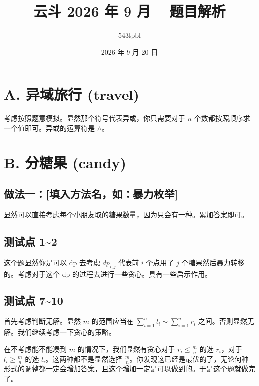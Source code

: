 \documentclass[12pt]{ctexart}  %
\title{云斗 2026 年 9 月 {~\color{bronze}{Bronze Round}} 题目解析}
\date{2026 年 9 月 20 日}
\author{543tpbl}
\begin{document}
\maketitle


\section{A. 异域旅行 (travel)}

考虑按照题意模拟。显然那个符号代表异或，你只需要对于 $n$ 个数都按照顺序求一个值即可。异或的运算符是 \texttt{$\wedge$}。




\section{B. 分糖果 (candy)}

\subsection{做法一：[填入方法名，如：暴力枚举]}

显然可以直接考虑每个小朋友取的糖果数量，因为只会有一种。累加答案即可。

\subsection{测试点 1\textasciitilde 2}

这个题显然你是可以 dp 去考虑 $dp_{i,j}$ 代表前 $i$ 个点用了 $j$ 个糖果然后暴力转移的。考虑对于这个 dp 的过程去进行一些贪心。具有一些启示作用。

\subsection{测试点 7\textasciitilde 10}

首先考虑判断无解。显然 $m$ 的范围应当在 $\displaystyle \sum_{i=1}^{n} l_i \sim \sum_{i=1}^{n} r_i$ 之间。否则显然无解。我们继续考虑一下贪心的策略。

在不考虑能不能凑到 $m$ 的情况下，我们显然有贪心对于 $r_i \le \frac{m}{n}$ 的选 $r_i$，对于 $l_i \ge \frac{m}{n}$ 的选 $l_i$。这两种都不是显然选择 $\frac{m}{n}$。你发现这已经是最优的了，无论何种形式的调整都一定会增加答案，且这个增加一定是可以做到的。于是这个题就做完了。
\end{document}
